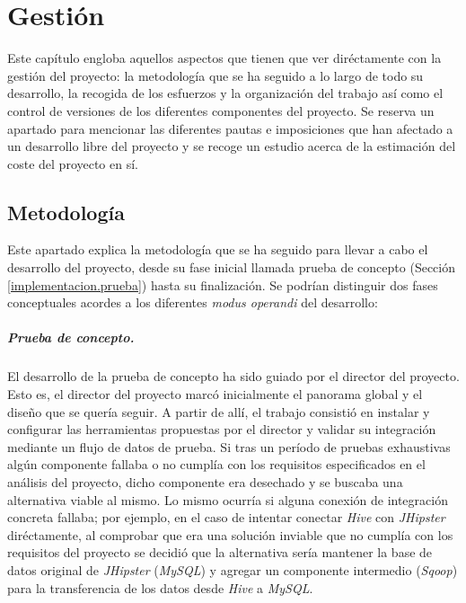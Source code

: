 \chapter{Gestión} \label{gestion}
Este capítulo engloba aquellos aspectos que tienen que ver diréctamente con la gestión del proyecto: la metodología que se ha seguido a lo largo de todo su desarrollo, la  recogida de los esfuerzos y la organización del trabajo así como el control de versiones de los diferentes componentes del proyecto. Se reserva un apartado para mencionar las diferentes pautas e imposiciones que han afectado a un desarrollo libre del proyecto y  se recoge un estudio acerca de la estimación del coste del proyecto en sí. 

\section{Metodología} \label{gestion.metodologia}
Este apartado explica la metodología que se ha seguido para llevar a cabo el desarrollo del proyecto, desde su fase inicial llamada prueba de concepto (Sección \ref{implementacion.prueba}) hasta su finalización. Se podrían distinguir dos fases conceptuales acordes a los diferentes \textit{modus operandi} del desarrollo: 
\paragraph*{Prueba de concepto.} El desarrollo de la prueba de concepto ha sido guiado por el director del proyecto. Esto es, el director del proyecto marcó inicialmente el panorama global y el diseño que se quería seguir. A partir de allí, el trabajo consistió en instalar y configurar las herramientas propuestas por el director y validar su integración mediante un flujo de datos de prueba. Si tras un período de pruebas exhaustivas algún componente fallaba o no cumplía con los requisitos especificados en el análisis del proyecto, dicho componente era desechado y se buscaba una alternativa viable al mismo. Lo mismo ocurría si alguna conexión de integración concreta fallaba; por ejemplo, en el caso de intentar conectar \textit{Hive} con \textit{JHipster} diréctamente, al comprobar que era una solución inviable que no cumplía con los requisitos del proyecto se decidió que la alternativa sería mantener la base de datos original de \textit{JHipster} (\textit{MySQL}) y agregar un componente intermedio (\textit{Sqoop}) para la transferencia de los datos desde \textit{Hive} a \textit{MySQL}.
